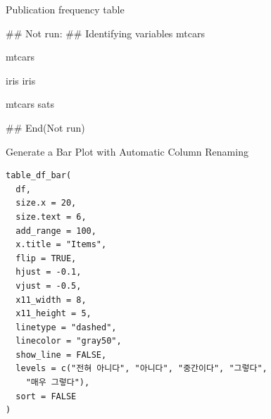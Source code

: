 \documentclass[a4paper]{book}
\begin{document}
%
\begin{Value}
Publication frequency table
\end{Value}
%
\begin{Examples}
\begin{ExampleCode}

\#\# Not run: 
## Identifying variables
 mtcars %

 mtcars %

 iris %
 iris %


 mtcars %
 sats %



## End(Not run)


\end{ExampleCode}
\end{Examples}
%
\begin{Description}
Generate a Bar Plot with Automatic Column Renaming
\end{Description}
%
\begin{Usage}
\begin{verbatim}
table_df_bar(
  df,
  size.x = 20,
  size.text = 6,
  add_range = 100,
  x.title = "Items",
  flip = TRUE,
  hjust = -0.1,
  vjust = -0.5,
  x11_width = 8,
  x11_height = 5,
  linetype = "dashed",
  linecolor = "gray50",
  show_line = FALSE,
  levels = c("전혀 아니다", "아니다", "중간이다", "그렇다",
    "매우 그렇다"),
  sort = FALSE
)
\end{verbatim}
\end{Usage}
%
\end{document}
